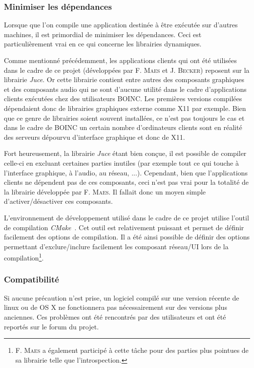 \documentclass[a4paper, 11pt]{report}
\begin{document}
\subsubsection{Minimiser les dépendances}
Lorsque que l'on compile une application destinée à être exécutée sur d'autres machines, il est primordial de minimiser les dépendances. Ceci est particulièrement vrai en ce qui concerne les librairies dynamiques.

Comme mentionné précédemment, les applications clients qui ont été utilisées dans le cadre de ce projet (développées par F. \textsc{Maes} et J. \textsc{Becker}) reposent sur la librairie \textit{Juce}. Or cette librairie contient entre autres des composants graphiques et des composants audio qui ne sont d'aucune utilité dans le cadre d'applications clients exécutées chez des utilisateurs \textsc{BOINC}. Les premières versions compilées dépendaient donc de librairies graphiques externe comme X11 par exemple. Bien que ce genre de librairies soient souvent installées, ce n'est pas toujours le cas et dans le cadre de \textsc{BOINC} un certain nombre d'ordinateurs clients sont en réalité des serveurs dépourvu d'interface graphique et donc de X11.

Fort heureusement, la librairie \textit{Juce} étant bien conçue, il est possible de compiler celle-ci en excluant certaines parties inutiles (par exemple tout ce qui touche à l'interface graphique, à l'audio, au réseau, ...). Cependant, bien que l'applications clients ne dépendent pas de ces composants, ceci n'est pas vrai pour la totalité de la librairie développée par F. \textsc{Maes}. Il fallait donc un moyen simple d'activer/désactiver ces composants. 

L'environnement de développement utilisé dans le cadre de ce projet utilise l'outil de compilation \textit{CMake}~\cite{CMAKE}. Cet outil est relativement puissant et permet de définir facilement des options de compilation. Il a été ainsi possible de définir des options permettant d'exclure/inclure facilement les composant réseau/UI lors de la compilation\footnote{F. \textsc{Maes} a également participé à cette tâche pour des parties plus pointues de sa librairie telle que l'introspection.}.  

\subsubsection{Compatibilité}
Si aucune précaution n'est prise, un logiciel compilé sur une version récente de linux ou de OS X ne fonctionnera pas nécessairement sur des versions plus anciennes. Ces problèmes ont été rencontrés par des utilisateurs et ont été reportés sur le forum du projet.
\end{document}
